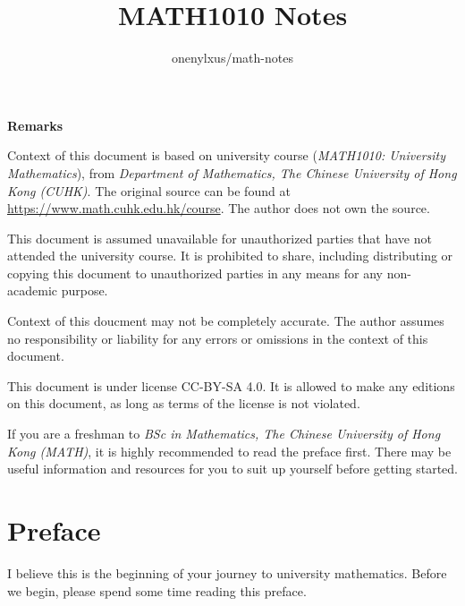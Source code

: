 \documentclass[a4paper,12pt]{article}
\begin{document}
\title{MATH1010 Notes}
\author{onenylxus/math-notes}
\makeatletter
\let\getauthor\@author
\let\gettitle\@title
\makeatother
\maketitle
\thispagestyle{empty}

\n\n

\noindent \textbf{Remarks}
\begin{nlist}
  \item Context of this document is based on university course (\textit{MATH1010: University Mathematics}), from \textit{Department of Mathematics, The Chinese University of Hong Kong (CUHK)}. The original source can be found at \url{https://www.math.cuhk.edu.hk/course}. The author does not own the source.
  \item This document is assumed unavailable for unauthorized parties that have not attended the university course. It is prohibited to share, including distributing or copying this document to unauthorized parties in any means for any non-academic purpose.
  \item Context of this doucment may not be completely accurate. The author assumes no responsibility or liability for any errors or omissions in the context of this document.
  \item This document is under license CC-BY-SA 4.0. It is allowed to make any editions on this document, as long as terms of the license is not violated.\color{aw}
  \item If you are a freshman to \textit{BSc in Mathematics, The Chinese University of Hong Kong (MATH)}, it is highly recommended to read the preface first. There may be useful information and resources for you to suit up yourself before getting started.
\end{nlist}

\pagebreak

\tableofcontents
\thispagestyle{empty}
\pagebreak

\pagestyle{fancy}
\fancyhf{}
\setlength{\headheight}{15.2pt}
\fancyhead[R]{\nouppercase \lastrightmark}
\fancyfoot[L]{\gettitle}
\fancyfoot[R]{\thepage}

\section*{Preface}
I believe this is the beginning of your journey to university mathematics. Before we begin, please spend some time reading this preface.\n
\end{document}
